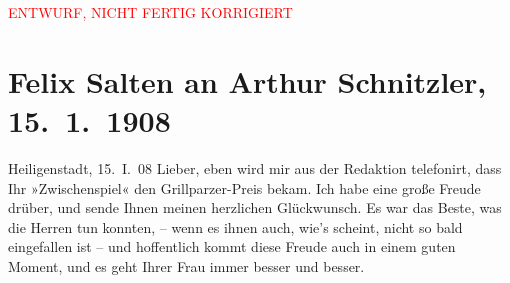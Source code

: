 
\begin{center}
            \textcolor{red}{ENTWURF, NICHT FERTIG KORRIGIERT}
                      \end{center}
            
         
         \renewcommand{\erwaehntePersonen}{Personen: Ottilie Salten, Olga Schnitzler}
         \renewcommand{\erwaehnteInstitutionen}{Institutionen: Franz-Grillparzer-Preis}
         \renewcommand{\erwaehnteOrte}{Orte: Heiligenstadt, Wien}
         \renewcommand{\erwaehnteWerke}{Werke: Zwischenspiel. Komödie in drei Akten}
               \section[Felix Salten an Arthur Schnitzler, 15. 1. 1908]{ Felix Salten an Arthur Schnitzler, 15. 1. 1908}\nopagebreak{}\rehead{ }\begin{ledgroupsized}[t]{13cm}\normalsize\beginnumbering \toendnotes[C]{\smallbreak\pagebreak[2]} 
\toendnotes[C]{\smallbreak}\pstart
           \raggedleft{}{\pb}Heiligenstadt, 15. I. 08\pend
           \pstart{}Lieber,\pend\pstart
           eben wird mir aus der Redaktion telefonirt, dass Ihr »Zwischenspiel« den Grillparzer-Preis
               bekam. Ich habe eine große Freude drüber, und sende Ihnen meinen herzlichen
               Glückwunsch. Es war das Beste, was die Herren tun konnten, – wenn es ihnen auch,
               wie’s scheint, nicht so bald eingefallen ist – und hoffentlich kommt diese Freude
               auch in einem guten Moment, und es geht Ihrer Frau immer besser und besser. \pend

\end{ledgroupsized}
